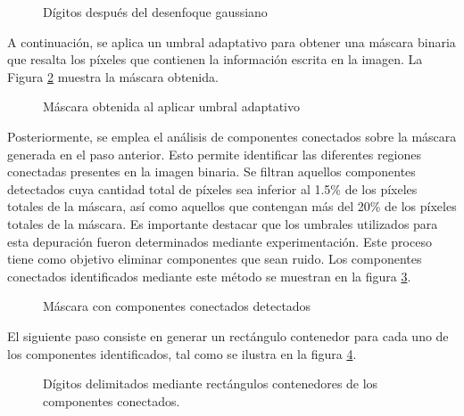 \begin{figure}[H]
    \centering
    \caption[Dígitos después del desenfoque gaussiano]{Dígitos después del desenfoque gaussiano}
    \label{fig:etl-4-votos-desenfocado}
\end{figure}

A continuación, se aplica un umbral adaptativo para obtener una máscara binaria que resalta los píxeles que contienen
la información escrita en la imagen. La Figura \ref{fig:etl-4-votos-mascara} muestra la máscara obtenida.

\begin{figure}[H]
    \centering
    \caption[Máscara obtenida al aplicar umbral adaptativo]{Máscara obtenida al aplicar umbral adaptativo}
    \label{fig:etl-4-votos-mascara}
\end{figure}

Posteriormente, se emplea el análisis de componentes conectados \parencite{bolelli2019spaghetti} sobre la máscara generada en el paso anterior. Esto permite identificar las diferentes
regiones conectadas presentes en la imagen binaria. Se filtran aquellos componentes detectados cuya cantidad total de
píxeles sea inferior al 1.5\% de los píxeles totales de la máscara, así como aquellos que contengan más del 20\% de los
píxeles totales de la máscara. Es importante destacar que los umbrales utilizados para esta depuración fueron
determinados mediante experimentación. Este proceso tiene como objetivo eliminar componentes que sean ruido. Los
componentes conectados identificados mediante este método se muestran en la figura \ref{fig:etl-4-votos-cc}.

\begin{figure}[H]
    \centering
    \caption[Máscara con componentes conectados detectados]{Máscara con componentes conectados detectados}
    \label{fig:etl-4-votos-cc}
\end{figure}

El siguiente paso consiste en generar un rectángulo contenedor para cada uno de los componentes identificados, tal como
se ilustra en la figura \ref{fig:etl-4-votos-bounding-boxes}.

\begin{figure}[H]
    \centering
    \caption[Dígitos delimitados]{Dígitos delimitados mediante rectángulos contenedores de los componentes conectados.}
    \label{fig:etl-4-votos-bounding-boxes}
\end{figure}

